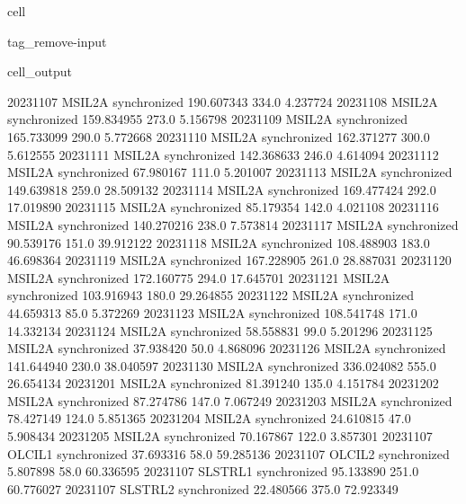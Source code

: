 \documentclass[letterpaper,10pt,english]{jupyterBook}
\begin{document}
\begin{sphinxuseclass}{cell}
\begin{sphinxuseclass}{tag_remove-input}
\begin{sphinxVerbatimOutput}
\begin{sphinxuseclass}{cell_output}
\begin{sphinxVerbatim}[commandchars=\\\{\}]
2023\PYGZhy{}11\PYGZhy{}07       MSIL2A  synchronized  190.607343   334.0    4.237724
2023\PYGZhy{}11\PYGZhy{}08       MSIL2A  synchronized  159.834955   273.0    5.156798
2023\PYGZhy{}11\PYGZhy{}09       MSIL2A  synchronized  165.733099   290.0    5.772668
2023\PYGZhy{}11\PYGZhy{}10       MSIL2A  synchronized  162.371277   300.0    5.612555
2023\PYGZhy{}11\PYGZhy{}11       MSIL2A  synchronized  142.368633   246.0    4.614094
2023\PYGZhy{}11\PYGZhy{}12       MSIL2A  synchronized   67.980167   111.0    5.201007
2023\PYGZhy{}11\PYGZhy{}13       MSIL2A  synchronized  149.639818   259.0   28.509132
2023\PYGZhy{}11\PYGZhy{}14       MSIL2A  synchronized  169.477424   292.0   17.019890
2023\PYGZhy{}11\PYGZhy{}15       MSIL2A  synchronized   85.179354   142.0    4.021108
2023\PYGZhy{}11\PYGZhy{}16       MSIL2A  synchronized  140.270216   238.0    7.573814
2023\PYGZhy{}11\PYGZhy{}17       MSIL2A  synchronized   90.539176   151.0   39.912122
2023\PYGZhy{}11\PYGZhy{}18       MSIL2A  synchronized  108.488903   183.0   46.698364
2023\PYGZhy{}11\PYGZhy{}19       MSIL2A  synchronized  167.228905   261.0   28.887031
2023\PYGZhy{}11\PYGZhy{}20       MSIL2A  synchronized  172.160775   294.0   17.645701
2023\PYGZhy{}11\PYGZhy{}21       MSIL2A  synchronized  103.916943   180.0   29.264855
2023\PYGZhy{}11\PYGZhy{}22       MSIL2A  synchronized   44.659313    85.0    5.372269
2023\PYGZhy{}11\PYGZhy{}23       MSIL2A  synchronized  108.541748   171.0   14.332134
2023\PYGZhy{}11\PYGZhy{}24       MSIL2A  synchronized   58.558831    99.0    5.201296
2023\PYGZhy{}11\PYGZhy{}25       MSIL2A  synchronized   37.938420    50.0    4.868096
2023\PYGZhy{}11\PYGZhy{}26       MSIL2A  synchronized  141.644940   230.0   38.040597
2023\PYGZhy{}11\PYGZhy{}30       MSIL2A  synchronized  336.024082   555.0   26.654134
2023\PYGZhy{}12\PYGZhy{}01       MSIL2A  synchronized   81.391240   135.0    4.151784
2023\PYGZhy{}12\PYGZhy{}02       MSIL2A  synchronized   87.274786   147.0    7.067249
2023\PYGZhy{}12\PYGZhy{}03       MSIL2A  synchronized   78.427149   124.0    5.851365
2023\PYGZhy{}12\PYGZhy{}04       MSIL2A  synchronized   24.610815    47.0    5.908434
2023\PYGZhy{}12\PYGZhy{}05       MSIL2A  synchronized   70.167867   122.0    3.857301
2023\PYGZhy{}11\PYGZhy{}07      OLCI\PYGZus{}L1  synchronized   37.693316    58.0   59.285136
2023\PYGZhy{}11\PYGZhy{}07      OLCI\PYGZus{}L2  synchronized    5.807898    58.0   60.336595
2023\PYGZhy{}11\PYGZhy{}07     SLSTR\PYGZus{}L1  synchronized   95.133890   251.0   60.776027
2023\PYGZhy{}11\PYGZhy{}07     SLSTR\PYGZus{}L2  synchronized   22.480566   375.0   72.923349

\end{sphinxVerbatim}
\end{sphinxuseclass}
\end{sphinxVerbatimOutput}
\end{sphinxuseclass}
\end{sphinxuseclass}
\end{document}
